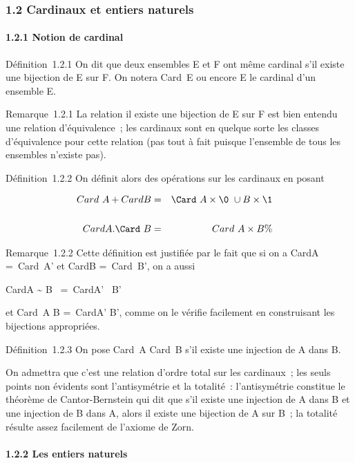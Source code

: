 
\subsubsection{1.2 Cardinaux et entiers naturels}

\paragraph{1.2.1 Notion de cardinal}

Définition~1.2.1 On dit que deux ensembles E et F ont même cardinal s'il
existe une bijection de E sur F. On notera
Card~E ou encore E le
cardinal d'un ensemble E.

Remarque~1.2.1 La relation il existe une bijection de E sur F est bien
entendu une relation d'équivalence~; les cardinaux sont en quelque sorte
les classes d'équivalence pour cette relation (pas tout à fait puisque
l'ensemble de tous les ensembles n'existe pas).

Définition~1.2.2 On définit alors des opérations sur les cardinaux en
posant

\begin{align*} Card~A
+ CardB& =& \Card~A
\times\0\ \cup B
\times\1\\%
\\
CardA.\Card~B& =&
Card~A \times B \%&
\\ \end{align*}

Remarque~1.2.2 Cette définition est justifiée par le fait que si on a
CardA =\ Card~A' et
CardB =\ Card~B', on a
aussi

CardA \times\0\~ \cup
B \times\1\ =\
CardA' \times\0\ \cup B'
\times\1\

et Card~A \times B =\
CardA' \times B', comme on le vérifie facilement en construisant les
bijections appropriées.

Définition~1.2.3 On pose Card~A
\leq Card~B s'il existe une injection de A dans B.

On admettra que c'est une relation d'ordre total sur les cardinaux~; les
seuls points non évidents sont l'antisymétrie et la totalité~:
l'antisymétrie constitue le théorème de Cantor-Bernstein qui dit que
s'il existe une injection de A dans B et une injection de B dans A,
alors il existe une bijection de A sur B~; la totalité résulte assez
facilement de l'axiome de Zorn.

\paragraph{1.2.2 Les entiers naturels}

